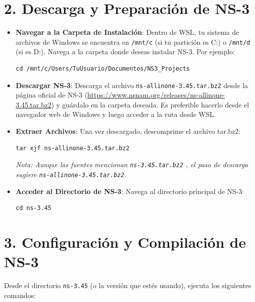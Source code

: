 \documentclass{article}
\begin{document}
\section*{\textbf{2. Descarga y Preparación de NS-3}}

\begin{itemize}
    \item \textbf{Navegar a la Carpeta de Instalación}: Dentro de WSL, tu sistema de archivos de Windows se encuentra en \texttt{/mnt/c} (si tu partición es C:) o \texttt{/mnt/d} (si es D:). Navega a la carpeta donde deseas instalar NS-3. Por ejemplo:
    \begin{lstlisting}
cd /mnt/c/Users/TuUsuario/Documentos/NS3_Projects 
    \end{lstlisting}
    \item \textbf{Descargar NS-3}: Descarga el archivo \texttt{ns-allinone-3.45.tar.bz2} desde la página oficial de NS-3 (\url{https://www.nsnam.org/releases/ns-allinone-3.45.tar.bz2}) y guárdalo en la carpeta deseada. Es preferible hacerlo desde el navegador web de Windows y luego acceder a la ruta desde WSL.
    \item \textbf{Extraer Archivos}: Una vez descargado, descomprime el archivo tar.bz2:
    \begin{lstlisting}
tar xjf ns-allinone-3.45.tar.bz2
    \end{lstlisting}
    \textit{Nota: Aunque las fuentes mencionan \texttt{ns-3.45.tar.bz2} , el paso de descarga sugiere \texttt{ns-allinone-3.45.tar.bz2}.}
    \item \textbf{Acceder al Directorio de NS-3}: Navega al directorio principal de NS-3:
    \begin{lstlisting}
cd ns-3.45  
    \end{lstlisting}
\end{itemize}

\section*{\textbf{3. Configuración y Compilación de NS-3}}

Desde el directorio \texttt{ns-3.45} (o la versión que estés usando), ejecuta los siguientes comandos:
\end{document}
